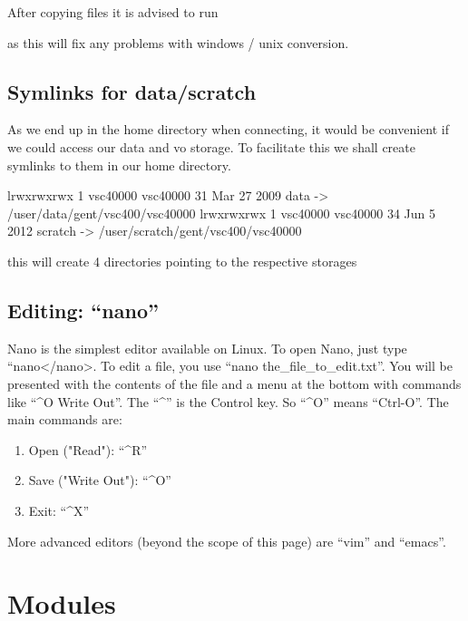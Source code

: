 After copying files it is advised to run 

\begin{prompt}
\end{prompt}

as this will fix any problems with windows / unix conversion.

\section{Symlinks for data/scratch}

As we end up in the home directory when connecting, it would be convenient if we could access our data and vo storage. To facilitate this we shall create symlinks to them in our home directory.

\begin{prompt}
lrwxrwxrwx 1 vsc40000 vsc40000 31 Mar 27  2009 data -> /user/data/gent/vsc400/vsc40000
lrwxrwxrwx 1 vsc40000 vsc40000 34 Jun  5  2012 scratch -> /user/scratch/gent/vsc400/vsc40000
\end{prompt}

this will create 4 directories pointing to the respective storages

\section{Editing: ``nano''}

Nano is the simplest editor available on Linux. To open Nano, just type ``nano</nano>. To edit a file, you use ``nano the_file_to_edit.txt''. You will be presented with the contents of the file and a menu at the bottom with commands like ``^O Write Out''. The ``^'' is the Control key. So ``^O'' means ``Ctrl-O''. The main commands are:

\begin{enumerate}
\item Open ("Read"): ``^R''
\item Save ("Write Out"): ``^O''
\item Exit: ``^X''
\end{enumerate}

More advanced editors (beyond the scope of this page) are ``vim'' and ``emacs''.

\chapter{Modules}

